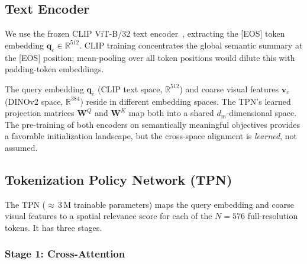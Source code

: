 \documentclass[11pt,a4paper]{article}
\newcommand{\R}{\mathbb{R}}
\newcommand{\vv}{\mathbf{v}}
\newcommand{\vq}{\mathbf{q}}
\begin{document}
\subsection{Text Encoder}
\label{subsec:text_enc}

We use the frozen CLIP ViT-B/32 text encoder~\citep{radford2021learning},
extracting the [EOS] token embedding $\vq_e\in\R^{512}$. CLIP training
concentrates the global semantic summary at the [EOS] position; mean-pooling
over all token positions would dilute this with padding-token embeddings.

\begin{intuitionbox}
  The query embedding $\vq_e$ (CLIP text space, $\R^{512}$) and coarse visual
  features $\vv_c$ (DINOv2 space, $\R^{384}$) reside in different embedding
  spaces. The TPN's learned projection matrices $\mathbf{W}^Q$ and
  $\mathbf{W}^K$ map both into a shared $d_{\mathrm{m}}$-dimensional space. The
  pre-training of both encoders on semantically meaningful objectives provides a
  favorable initialization landscape, but the cross-space alignment is
  \emph{learned}, not assumed.
\end{intuitionbox}

\subsection{Tokenization Policy Network (TPN)}
\label{subsec:tpn}

The TPN (${\approx}\,3$\,M trainable parameters) maps the query embedding and
coarse visual features to a spatial relevance score for each of the $N{=}576$
full-resolution tokens. It has three stages.

\subsubsection{Stage 1: Cross-Attention}
\label{subsubsec:cross_attn}
\end{document}
